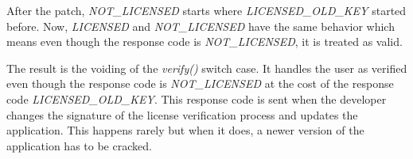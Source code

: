 After the patch, \textit{NOT\_LICENSED} starts where \textit{LICENSED\_OLD\_KEY} started before.
Now, \textit{LICENSED} and \textit{NOT\_LICENSED} have the same behavior which means even though the response code is \textit{NOT\_LICENSED}, it is treated as valid.
\newline

The result is the voiding of the \textit{verify()} switch case.
It handles the user as verified even though the response code is \textit{NOT\_LICENSED} at the cost of the response code \textit{LICENSED\_OLD\_KEY}.
This response code is sent when the developer changes the signature of the license verification process and updates the application.
This happens rarely but when it does, a newer version of the application has to be cracked.

